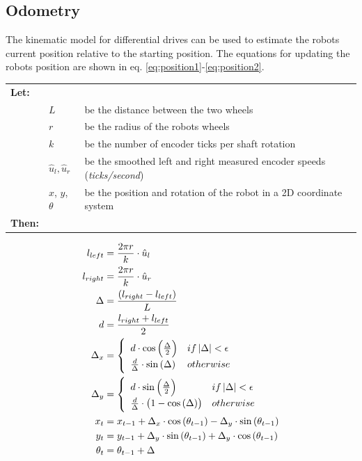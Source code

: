 \documentclass[11pt]{article}
\begin{document}
\subsection{Odometry\label{sec:odometrymath}}
The kinematic model for differential drives can be used to estimate the robots
current position relative to the starting position. The equations for updating
the robots position are shown in
eq. \ref{eq:position1}-\vref*{eq:position2}. \par
{\footnotesize
  \begin{tabular}{l l l}
    \textbf{Let:} \\
 &$L$ &be the distance between the two wheels \\
 &$r$ &be the radius of the robots wheels \\
 &$k$ &be the number of encoder ticks per shaft rotation\\
 &$\hat{u}_l, \hat{u}_r$ &be the smoothed left and right measured encoder speeds (\emph{ticks/second})\\
&$x$, $y$, $\theta$ &be the position and rotation of the robot in a 2D coordinate system\\
    \textbf{Then:}
  \end{tabular}
  \begin{align}
    l_{left} &= \frac{2\pi r}{k} \cdot \hat{u}_l\label{eq:position1}\\
    l_{right} &= \frac{2\pi r}{k} \cdot \hat{u}_r\\
    \Delta &= \frac{(l_{right} - l_{left})}{L}\\
    d &= \frac{l_{right} + l_{left}}{2}\\
    \Delta_x &= \begin{cases}
                    \hspace{5pt}d \cdot \cos\left(\frac{\Delta}{2}\right) & if \left|\Delta\right| < \epsilon\\
                    \hspace{5pt}\frac{d}{\Delta} \cdot \sin\left(\Delta\right) & otherwise
                  \end{cases} \vspace{5pt}  \\
    \Delta_y &= \begin{cases}
                    \hspace{5pt}d \cdot \sin\left(\frac{\Delta}{2}\right) & if \left|\Delta\right| < \epsilon\\
                    \hspace{5pt}\frac{d}{\Delta} \cdot \left(1-\cos\left(\Delta\right)\right) & otherwise
                  \end{cases} \vspace{5pt}\\
    x_t &= x_{t-1} + \Delta_x \cdot \cos\left(\theta_{t-1}\right) - \Delta_y \cdot \sin\left(\theta_{t-1}\right)\\
    y_t &= y_{t-1} + \Delta_y \cdot \sin\left(\theta_{t-1}\right) + \Delta_y \cdot \cos\left(\theta_{t-1}\right)\\
    \theta_t &= \theta_{t-1} + \Delta\hspace{10pt}\label{eq:position2}
  \end{align}}
\end{document}
